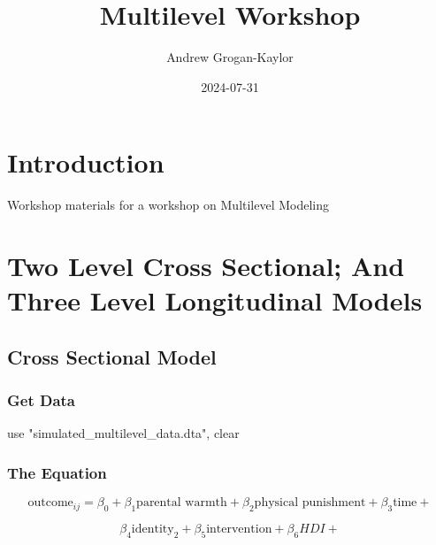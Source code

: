 \documentclass[
  letterpaper,
  DIV=11,
  numbers=noendperiod]{scrreprt}
\title{Multilevel Workshop}
\author{Andrew Grogan-Kaylor}
\date{2024-07-31}
\newenvironment{Shaded}{\begin{snugshade}}{\end{snugshade}}
\newcommand{\KeywordTok}[1]{\textcolor[rgb]{0.00,0.23,0.31}{#1}}
\newcommand{\NormalTok}[1]{\textcolor[rgb]{0.00,0.23,0.31}{#1}}
\newcommand{\StringTok}[1]{\textcolor[rgb]{0.13,0.47,0.30}{#1}}
\renewcommand*\contentsname{Table of contents}
\newcommand\contentsname{Table of contents}
\begin{document}
\maketitle

\renewcommand*\contentsname{Table of contents}
{
\hypersetup{linkcolor=}
\setcounter{tocdepth}{2}
\tableofcontents
}
\listoffigures
\listoftables
{}

\chapter{Introduction}\label{introduction}

Workshop materials for a workshop on Multilevel Modeling


\chapter{Two Level Cross Sectional; And Three Level Longitudinal
Models}\label{two-level-cross-sectional-and-three-level-longitudinal-models}

\section{Cross Sectional Model}\label{cross-sectional-model}

\subsection{Get Data}\label{get-data}

\begin{Shaded}
\begin{Highlighting}[]

\KeywordTok{use} \StringTok{"simulated\_multilevel\_data.dta"}\NormalTok{, }\KeywordTok{clear}
\end{Highlighting}
\end{Shaded}

\subsection{The Equation}\label{the-equation}

\[\text{outcome}_{ij} = \beta_0 + \beta_1 \text{parental warmth} + \beta_2 \text{physical punishment} + \beta_3 \text{time} + \]

\[\beta_4 \text{identity}_2 + \beta_5 \text{intervention} + \beta_6 HDI +\]
\end{document}
